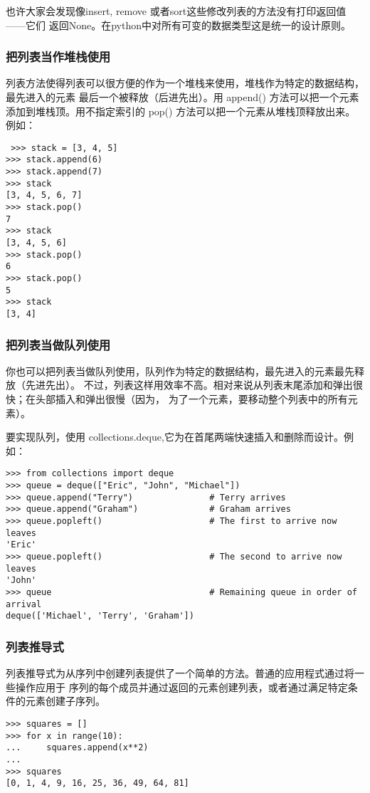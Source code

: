 \documentclass[UTF8]{ctexart}
\begin{document}
也许大家会发现像insert, remove 或者sort这些修改列表的方法没有打印返回值——它们
返回None。在python中对所有可变的数据类型这是统一的设计原则。
\subsubsection{把列表当作堆栈使用}
列表方法使得列表可以很方便的作为一个堆栈来使用，堆栈作为特定的数据结构，最先进入的元素
最后一个被释放（后进先出）。用 append() 方法可以把一个元素添加到堆栈顶。用不指定索引的
 pop() 方法可以把一个元素从堆栈顶释放出来。例如：
 \begin{verbatim}
 >>> stack = [3, 4, 5]
>>> stack.append(6)
>>> stack.append(7)
>>> stack
[3, 4, 5, 6, 7]
>>> stack.pop()
7
>>> stack
[3, 4, 5, 6]
>>> stack.pop()
6
>>> stack.pop()
5
>>> stack
[3, 4]
\end{verbatim}
\subsubsection{把列表当做队列使用}
你也可以把列表当做队列使用，队列作为特定的数据结构，最先进入的元素最先释放（先进先出）。
不过，列表这样用效率不高。相对来说从列表末尾添加和弹出很快；在头部插入和弹出很慢（因为，
为了一个元素，要移动整个列表中的所有元素）。

要实现队列，使用 collections.deque,它为在首尾两端快速插入和删除而设计。例如：
\begin{verbatim}
>>> from collections import deque
>>> queue = deque(["Eric", "John", "Michael"])
>>> queue.append("Terry")               # Terry arrives
>>> queue.append("Graham")              # Graham arrives
>>> queue.popleft()                     # The first to arrive now leaves
'Eric'
>>> queue.popleft()                     # The second to arrive now leaves
'John'
>>> queue                               # Remaining queue in order of arrival
deque(['Michael', 'Terry', 'Graham'])
\end{verbatim}
\subsubsection{列表推导式}
列表推导式为从序列中创建列表提供了一个简单的方法。普通的应用程式通过将一些操作应用于
序列的每个成员并通过返回的元素创建列表，或者通过满足特定条件的元素创建子序列。
\begin{verbatim}
>>> squares = []
>>> for x in range(10):
...     squares.append(x**2)
...
>>> squares
[0, 1, 4, 9, 16, 25, 36, 49, 64, 81]
\end{verbatim}
\end{document}
